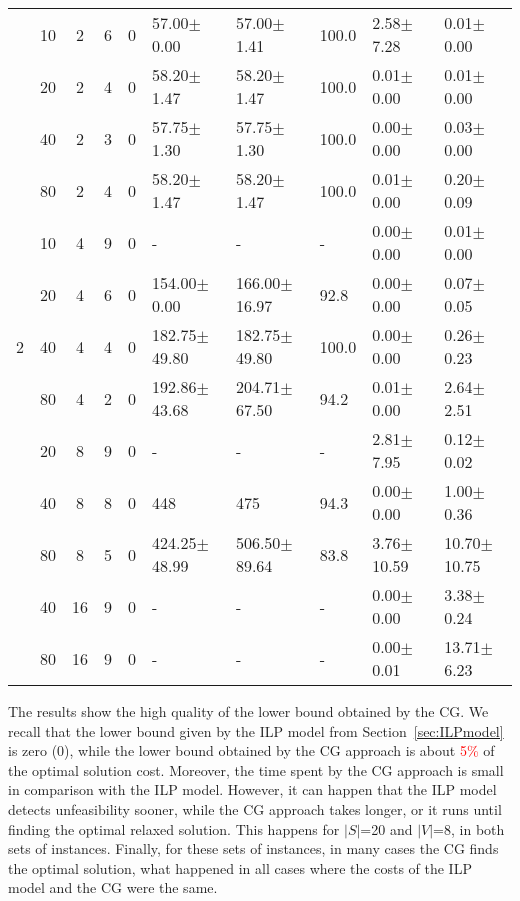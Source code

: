 \documentclass{llncs}
\begin{document}
\begin{table}[h]
\begin{center}
\begin{tabular}{c c c| c c l l l l l}
\hline
&10 & 2    & 6 & 0 &  57.00$\pm$0.00        &  57.00$\pm$1.41     &  100.0     &  2.58$\pm$7.28      &  0.01$\pm$0.00       \\
&20 & 2    & 4 & 0 &  58.20$\pm$1.47        &  58.20$\pm$1.47     &  100.0     &  0.01$\pm$0.00      &  0.01$\pm$0.00       \\
&40 & 2    & 3 & 0 &  57.75$\pm$1.30        &  57.75$\pm$1.30     &  100.0     &  0.00$\pm$0.00      &  0.03$\pm$0.00       \\
&80 & 2    & 4 & 0 &  58.20$\pm$1.47        &  58.20$\pm$1.47     &  100.0     &  0.01$\pm$0.00      &  0.20$\pm$0.09       \\
&10 & 4    & 9 & 0 &  -                   &  -                    &  -         &  0.00$\pm$0.00      &  0.01$\pm$0.00       \\
&20 & 4    & 6 & 0 &  154.00$\pm$0.00       &  166.00$\pm$16.97   &  92.8      &  0.00$\pm$0.00      &  0.07$\pm$0.05       \\
2&40 & 4   & 4 & 0 &  182.75$\pm$49.80      &  182.75$\pm$49.80    &  100.0   &  0.00$\pm$0.00      &  0.26$\pm$0.23       \\
&80 & 4    & 2 & 0 &  192.86$\pm$43.68      &  204.71$\pm$67.50   &  94.2      &  0.01$\pm$0.00      &  2.64$\pm$2.51       \\
&20 & 8    & 9 & 0 &  -                     &  -                  &  -          &  2.81$\pm$7.95      &  0.12$\pm$0.02       \\
&40 & 8    & 8 & 0 &  448                   &  475                &  94.3      &  0.00$\pm$0.00      &  1.00$\pm$0.36       \\
&80 & 8    & 5 & 0 &  424.25$\pm$48.99      &  506.50$\pm$89.64   &  83.8       &  3.76$\pm$10.59     &  10.70$\pm$10.75     \\
&40 & 16   & 9 & 0 &  -                     &  -                  &  -          &  0.00$\pm$0.00      &  3.38$\pm$0.24       \\
&80 & 16   & 9 & 0 &  -                     &  -                  &  -          &  0.00$\pm$0.01      &  13.71$\pm$6.23      \\
\end{tabular}
\end{center}
\end{table}
The results show the high quality of the lower bound obtained by the CG. We recall that the lower bound given by the ILP model from Section~\ref{sec:ILPmodel} is zero (0),
while the lower bound obtained by the CG approach is about \textcolor{red}{5\%} of the optimal solution cost.
Moreover, the time spent by the CG approach is small in comparison with the ILP model.
However, it can happen that the ILP model detects unfeasibility sooner, while the CG approach takes longer, or it runs until finding the optimal relaxed solution. 
This happens for $|S|$=20 and $|V|$=8, in both sets of instances. 
Finally, for these sets of instances, in many cases
the CG finds the optimal solution, what happened in all cases where the costs of the ILP model and the CG were the same.
\end{document}
